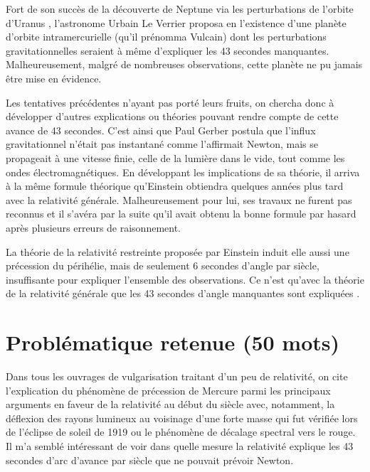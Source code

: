 \documentclass[12pt,a4paper]{article}
\newcommand{\ofg}[1]{\og{}#1\fg{}}
\begin{document}
Fort de son succès de la découverte de Neptune via les perturbations de l'orbite d'Uranus \cite{leVerrier1846}, l'astronome Urbain Le Verrier proposa en  \cite{leVerrier1859theorie,WikiMercure} l'existence d'une planète d'orbite intramercurielle (qu'il prénomma \ofg{Vulcain}) dont les perturbations gravitationnelles seraient à même d'expliquer les 43 secondes manquantes. Malheureusement, malgré de nombreuses observations, cette planète ne pu jamais être mise en évidence.

Les tentatives précédentes n'ayant pas porté leurs fruits, on chercha donc à développer d'autres explications ou théories pouvant rendre compte de cette avance de 43 secondes. C'est ainsi que Paul Gerber \cite{gerber1898raumliche} postula que l'influx gravitationnel n'était pas instantané comme l'affirmait Newton, mais se propageait à une vitesse finie, celle de la lumière dans le vide, tout comme les ondes électromagnétiques. En développant les implications de sa théorie, il arriva à la même formule théorique qu'Einstein obtiendra quelques années plus tard avec la relativité générale. Malheureusement pour lui, ses travaux ne furent pas reconnus et il s'avéra par la suite qu'il avait obtenu la bonne formule par hasard après plusieurs erreurs de raisonnement.

La théorie de la relativité restreinte \cite{MPEinsteinSpecialRelativity} proposée par Einstein \cite{einstein1905erzeugung} induit elle aussi une précession du périhélie, mais de seulement 6 secondes d'angle par siècle, insuffisante pour expliquer l'ensemble des observations. Ce n'est qu'avec la théorie de la relativité générale \cite{einstein1916grundlage} que les 43 secondes d'angle manquantes sont expliquées \cite{silberstein1917motion,PlusieursAuteurs}.
\section*{Problématique retenue (50 mots)}
 Dans tous les ouvrages de vulgarisation traitant d'un peu de relativité, on cite l'explication du phénomène de précession de Mercure parmi les principaux arguments en faveur de la relativité au début du siècle avec, notamment, la déflexion des rayons lumineux au voisinage d'une forte masse qui fut vérifiée lors de l'éclipse de soleil de 1919 ou le phénomène de décalage spectral vers le rouge. Il m'a semblé intéressant de voir dans quelle mesure la relativité explique les 43 secondes d'arc d'avance par siècle que ne pouvait prévoir Newton.
\end{document}
